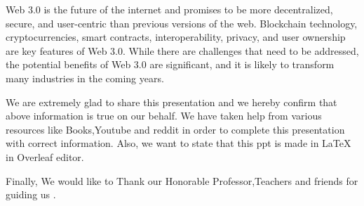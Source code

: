 \documentclass{beamer}
\begin{document}
\begin{frame}
\begin{block}{}
Web 3.0 is the future of the internet and promises to be more decentralized, secure, and user-centric than previous versions of the web. Blockchain technology, cryptocurrencies, smart contracts, interoperability, privacy, and user ownership are key features of Web 3.0. While there are challenges that need to be addressed, the potential benefits of Web 3.0 are significant, and it is likely to transform many industries in the coming years.
\end{block}
\end{frame}

\begin{frame}
\begin{block}{}
We are extremely glad to share this presentation and we hereby confirm that above information is true on our behalf.
We have taken help from various resources like Books,Youtube and reddit in order to complete this presentation with correct information.
Also, we want to state that this ppt is made in LaTeX in Overleaf editor.

Finally, We would like to Thank our Honorable Professor,Teachers and friends for guiding us .
\end{block}
\end{frame}
\end{document}

